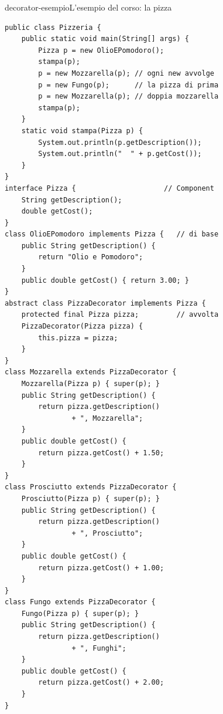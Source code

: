 \begin{programma}{decorator-esempio}{L'esempio del corso: la pizza}
\begin{lstlisting}[style=javacs, name=Pizzeria.java]
public class Pizzeria {
    public static void main(String[] args) {
        Pizza p = new OlioEPomodoro();
        stampa(p);
        p = new Mozzarella(p); // ogni new avvolge
        p = new Fungo(p);      // la pizza di prima
        p = new Mozzarella(p); // doppia mozzarella
        stampa(p);
    }
    static void stampa(Pizza p) {
        System.out.println(p.getDescription());
        System.out.println("  " + p.getCost());
    }
}
interface Pizza {                     // Component
    String getDescription();
    double getCost();
}
class OlioEPomodoro implements Pizza {   // di base
    public String getDescription() {
        return "Olio e Pomodoro";
    }
    public double getCost() { return 3.00; }
}
abstract class PizzaDecorator implements Pizza {
    protected final Pizza pizza;         // avvolta
    PizzaDecorator(Pizza pizza) {
        this.pizza = pizza;
    }
}
class Mozzarella extends PizzaDecorator {
    Mozzarella(Pizza p) { super(p); }
    public String getDescription() {
        return pizza.getDescription()
                + ", Mozzarella";
    }
    public double getCost() {
        return pizza.getCost() + 1.50;
    }
}
class Prosciutto extends PizzaDecorator {
    Prosciutto(Pizza p) { super(p); }
    public String getDescription() {
        return pizza.getDescription()
                + ", Prosciutto";
    }
    public double getCost() {
        return pizza.getCost() + 1.00;
    }
}
class Fungo extends PizzaDecorator {
    Fungo(Pizza p) { super(p); }
    public String getDescription() {
        return pizza.getDescription()
                + ", Funghi";
    }
    public double getCost() {
        return pizza.getCost() + 2.00;
    }
}
\end{lstlisting}
\tcblower
{}


\end{programma}
